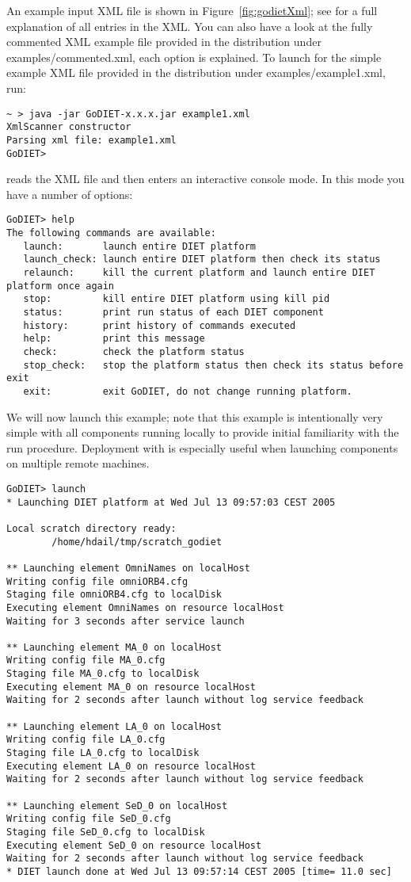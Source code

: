An example input XML file is shown in Figure~\ref{fig:godietXml}; see
\cite{CDa05} for a full explanation of all entries in the XML. You can also
have a look at the fully commented XML example file provided in the \godiet
distribution under examples/commented.xml, each option is explained. To launch
\godiet for the simple example XML file provided in the \godiet distribution
under examples/example1.xml, run:

\begin{verbatim}
~ > java -jar GoDIET-x.x.x.jar example1.xml
XmlScanner constructor
Parsing xml file: example1.xml
GoDIET>
\end{verbatim}

\godiet reads the XML file and then enters an interactive console mode. In this
mode you have a number of options:

\begin{verbatim}
GoDIET> help
The following commands are available:
   launch:       launch entire DIET platform
   launch_check: launch entire DIET platform then check its status
   relaunch:     kill the current platform and launch entire DIET platform once again
   stop:         kill entire DIET platform using kill pid
   status:       print run status of each DIET component
   history:      print history of commands executed
   help:         print this message
   check:        check the platform status
   stop_check:   stop the platform status then check its status before exit
   exit:         exit GoDIET, do not change running platform.
\end{verbatim}

We will now launch this example; note that this example is intentionally very
simple with all components running locally to provide initial familiarity with
the \godiet run procedure. Deployment with \godiet is especially useful  when
launching components on multiple remote machines.

\begin{verbatim}
GoDIET> launch
* Launching DIET platform at Wed Jul 13 09:57:03 CEST 2005

Local scratch directory ready:
        /home/hdail/tmp/scratch_godiet

** Launching element OmniNames on localHost
Writing config file omniORB4.cfg
Staging file omniORB4.cfg to localDisk
Executing element OmniNames on resource localHost
Waiting for 3 seconds after service launch

** Launching element MA_0 on localHost
Writing config file MA_0.cfg
Staging file MA_0.cfg to localDisk
Executing element MA_0 on resource localHost
Waiting for 2 seconds after launch without log service feedback

** Launching element LA_0 on localHost
Writing config file LA_0.cfg
Staging file LA_0.cfg to localDisk
Executing element LA_0 on resource localHost
Waiting for 2 seconds after launch without log service feedback

** Launching element SeD_0 on localHost
Writing config file SeD_0.cfg
Staging file SeD_0.cfg to localDisk
Executing element SeD_0 on resource localHost
Waiting for 2 seconds after launch without log service feedback
* DIET launch done at Wed Jul 13 09:57:14 CEST 2005 [time= 11.0 sec]
\end{verbatim}


